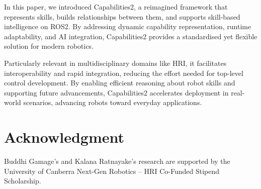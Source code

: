 \documentclass[conference]{IEEEtran}
\begin{document}



In this paper, we introduced Capabilities2, a reimagined framework that represents skills, builds relationships between them, and supports skill-based intelligence on ROS2. By addressing dynamic capability representation, runtime adaptability, and AI integration, Capabilities2 provides a standardised yet flexible solution for modern robotics.

Particularly relevant in multidisciplinary domains like HRI, it facilitates interoperability and rapid integration, reducing the effort needed for top-level control development. By enabling efficient reasoning about robot skills and supporting future advancements, Capabilities2 accelerates deployment in real-world scenarios, advancing robots toward everyday applications.

\section{Acknowledgment}

Buddhi Gamage's and Kalana Ratnayake's research are supported by the University of Canberra Next-Gen Robotics – HRI Co-Funded Stipend Scholarship. 



\balance

\end{document}
